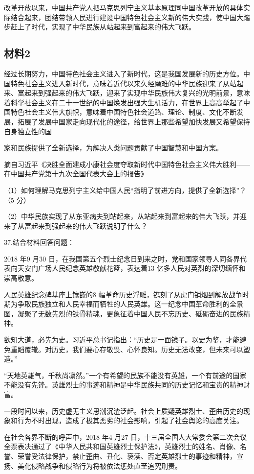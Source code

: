 \documentclass[UTF8,11pt]{ctexart}
\begin{document}
改革开放以来，中国共产党人把马克思列宁主义基本原理同中国改革开放的具体实际结合起来，团结带领人民进行建设中国特色社会主义新的伟大实践，使中国大踏步赶上了时代，实现了中华民族从站起来到富起来的伟大飞跃。

\subsection*{材料2}

经过长期努力，中国特色社会主义进入了新时代，这是我国发展新的历史方位。中国特色社会主义进入新时代，意味着近代以来久经磨难的中华民族迎来了从站起来、富起来到强起来的伟大飞跃，迎来了实现中华民族伟大复兴的光明前景，意味着科学社会主义在二十一世纪的中国焕发出强大生机活力，在世界上高高举起了中国特色社会主义伟大旗帜，意味着中国特色社会道路、理论、制度、文化不断发展，拓展了发展中国家走向现代化的途径，给世界上那些希望加快发展又希望保持自身独立性的国


家和民族提供了全新选择，为解决人类问题贡献了中国智慧和中国方案。

摘自习近平《决胜全面建成小康社会度夺取新时代中国特色社会主义伟大胜利——在中国共产党第十九次全国代表大会上的报告》

（1）如何理解马克思列宁主义给中国人民“指明了前进方向，提供了全新选择”？（5 分）


（2）中华民族实现了从东亚病夫到站起来，从站起来到富起来的伟大飞跃，并迎来了从富起来到强起来的伟大飞跃说明了什么？


37.结合材料回答问题：

2018 年9 月30 日，在我国第五个烈士纪念日到来之时，党和国家领导人同各界代表向天安门广场人民纪念英雄敬献花篮，表达着13 亿多人民对英烈的深切缅怀和崇高敬意。

人民英雄纪念碑基座上镶嵌的8 幅革命历史浮雕，镌刻了从虎门销烟到解放战争时期为争取民族独立和人民幸福而牺牲的人民英雄。这一纪念中国革命胜利的全景图，凝聚了无数先烈的铁骨精魂，更象征着中国人民不忘历史、砥砺奋进的民族精神。

欲知大道，必先为史。习近平总书记指出：“历史是一面镜子。以史为鉴，才能避免重蹈覆辙。对历史，我们要心存敬畏、心怀良知。历史无法改变，但未来可以塑造。”

“天地英雄气，千秋尚凛然。”一个有希望的民族不能没有英雄，一个有前途的国家不能没有先锋。英雄烈士的事迹和精神是中华民族共同的历史记忆和宝贵的精神财富。

一段时间以来，历史虚无主义思潮沉渣泛起。社会上质疑英雄烈士、歪曲历史的现象和行为不时出现，造成了极其恶劣的社会影响，引起了社会舆论的高度关注。

在社会各界不断的呼声中，2018 年4 月27 日，十三届全国人大常委会第二次会议全票表决通过了《中华人民共和国英雄烈士保护法》，英雄烈士的姓名、肖像、名誉、荣誉受法律保护，禁止歪曲、丑化、亵渎、否定英雄烈士的事迹和精神，宣扬、美化侵略战争和侵略行为将被依法惩处直至追究刑责。
\end{document}
